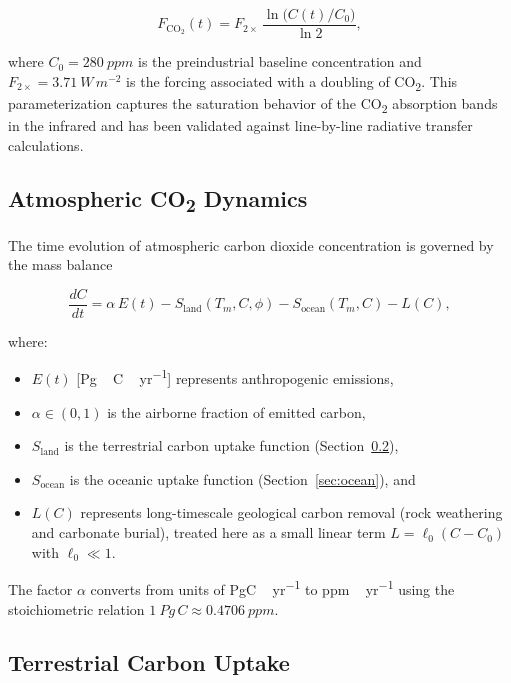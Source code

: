 \documentclass[12pt]{article}
\newcommand{\ddt}[1]{\frac{d#1}{dt}}
\newcommand{\FCO}{F_{\mathrm{CO_2}}}
\newcommand{\Slam}{S_{\mathrm{land}}}
\newcommand{\Soce}{S_{\mathrm{ocean}}}
\begin{document}
\begin{equation}
  \FCO(t) = F_{2\times}\,\frac{\ln\bigl(C(t)/C_0\bigr)}{\ln 2},
  \label{eq:FCO2}
\end{equation}

where $C_0 = \SI{280}{ppm}$ is the preindustrial baseline concentration and
$F_{2\times} = \SI{3.71}{W\,m^{-2}}$ is the forcing associated with a doubling
of CO\textsubscript{2}.  This parameterization captures the saturation behavior
of the CO\textsubscript{2} absorption bands in the infrared and has been
validated against line-by-line radiative transfer calculations.

\subsection{Atmospheric CO\texorpdfstring{\textsubscript{2}}{2} Dynamics}

The time evolution of atmospheric carbon dioxide concentration is governed by the
mass balance

\begin{equation}
  \ddt{C} = \alpha\, E(t) - \Slam(T_m, C, \phi) - \Soce(T_m, C) - L(C),
  \label{eq:CO2}
\end{equation}

where:
\begin{itemize}
  \item $E(t)$ [\si{Pg\,C\,yr^{-1}}] represents anthropogenic emissions,
  \item $\alpha \in (0,1)$ is the airborne fraction of emitted carbon,
  \item $\Slam$ is the terrestrial carbon uptake function (Section~\ref{sec:land}),
  \item $\Soce$ is the oceanic uptake function (Section~\ref{sec:ocean}), and
  \item $L(C)$ represents long-timescale geological carbon removal (rock
        weathering and carbonate burial), treated here as a small linear term
        $L = \ell_0(C - C_0)$ with $\ell_0 \ll 1$.
\end{itemize}

The factor $\alpha$ converts from units of \si{PgC\,yr^{-1}} to \si{ppm\,yr^{-1}}
using the stoichiometric relation $\SI{1}{Pg\,C} \approx \SI{0.4706}{ppm}$.

\subsection{Terrestrial Carbon Uptake}
\label{sec:land}
\end{document}
